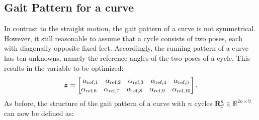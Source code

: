 \documentclass[letterpaper,10pt,conference]{ieeeconf}  %
\begin{document}
\subsection{Gait Pattern for a curve}
In contrast to the straight motion, the gait pattern of a curve is not symmetrical.
However, it still reasonable to assume that a cycle consists of two poses, each with diagonally opposite fixed feet.
Accordingly, the running pattern of a curve has ten unknowns, namely the reference angles of the two poses of a cycle.
This results in the variable to be optimized:
\begin{equation}
\bm{z} = 
\begin{bmatrix}
\begin{matrix}
\alpha_{\textnormal{ref},1}& \alpha_{\textnormal{ref},2}&\alpha_{\textnormal{ref},3}&\alpha_{\textnormal{ref},4}&\alpha_{\textnormal{ref},5}
\end{matrix}
 \\
\begin{matrix}
\alpha_{\textnormal{ref},6}& \alpha_{\textnormal{ref},7}&\alpha_{\textnormal{ref},8}&\alpha_{\textnormal{ref},9}&\alpha_{\textnormal{ref},10}
\end{matrix}
\end{bmatrix} .
\end{equation}
As before, the structure of the gait pattern of a curve with $n$ cycles $\bm{R}_\mathcal{C}^n \in \mathbb{R}^{2n\times 9}$ can now be defined as:
\end{document}
